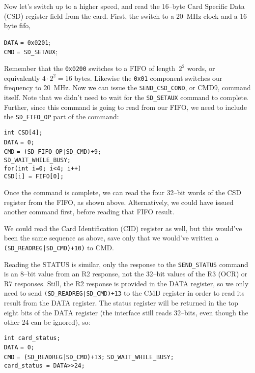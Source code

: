 \documentclass{gqtekspec}
\begin{document}
Now let's switch up to a higher speed, and read the 16--byte Card Specific
Data (CSD) register field from the card.  First, the switch to a 20~MHz clock
and a 16--byte fifo,
\begin{tabbing}
{\tt DATA} \= {\tt = 0x0201}; \\
{\tt CMD} \> {\tt = SD\_SETAUX};
\end{tabbing}
Remember that the {\tt 0x0200} switches to a FIFO of length~$2^2$ words, or
equivalently $4\cdot 2^2=16$ bytes.  Likewise the {\tt 0x01} component switches
our frequency to 20~MHz.  Now we can issue the {\tt SEND\_CSD\_COND}, or
CMD9, command itself.  Note that we didn't need to wait for the {\tt SD\_SETAUX}
command to complete.  Further, since this command is going to read from our
FIFO, we need to include the {\tt SD\_FIFO\_OP} part of the command:
\begin{tabbing}
{\tt int CSD[4];}\\
{\tt DATA} \= {\tt = 0;} \\
{\tt CMD} \> {\tt = (SD\_FIFO\_OP|SD\_CMD)+9;} \\
{\tt SD\_WAIT\_WHILE\_BUSY;} \\
{\tt for(int i=0; i<4; i++) } \\
\> {\tt CSD[i] = FIFO[0];}
\end{tabbing}
Once the command is complete, we can read the four 32--bit words of the CSD
register from the FIFO, as shown above.  Alternatively, we could have issued
another command first, before reading that FIFO result.

We could read the Card Identification (CID) register as well, but this would've
been the same sequence as above, save only that we would've written a 
{\tt (SD\_READREG|SD\_CMD)+10)} to CMD.

Reading the STATUS is similar, only the response to the {\tt SEND\_STATUS}
command is an 8--bit value from an R2 response, not the 32--bit values of
the R3 (OCR) or R7 responses.  Still, the R2 response is provided in the
DATA register, so we only need to send {\tt (SD\_READREG|SD\_CMD)+13} to
the CMD register in order to read its result from the DATA register.  The status
register will be returned in the top eight bits of the DATA register (the
interface still reads 32--bits, even though the other 24 can be ignored), so:
\begin{tabbing}
{\tt int card\_status;}\\
{\tt DATA} \= {\tt = 0;} \\
{\tt CMD} \> {\tt = (SD\_READREG|SD\_CMD)+13;}
{\tt SD\_WAIT\_WHILE\_BUSY;} \\
{\tt card\_status = DATA>>24;}
\end{tabbing}
\end{document}
